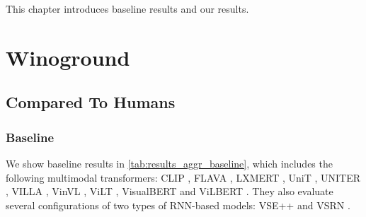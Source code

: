 This chapter introduces baseline results and our results.

\section{Winoground}

\subsection{Compared To Humans}

\subsubsection{Baseline}

We show baseline results in \cref{tab:results_aggr_baseline}, which includes the following multimodal transformers: CLIP \cite{radford2021clip}, FLAVA \cite{singh2022flava}, LXMERT \cite{tan2020lxmert}, UniT \cite{hu2021unit}, UNITER \cite{chen2020uniter}, VILLA \cite{gan2020villa}, VinVL \cite{zhang2021vinvl}, ViLT \cite{kim2021vilt}, VisualBERT \cite{li2019visualbert} and ViLBERT \cite{lu2019vilbert}. They also evaluate several configurations of two types of RNN-based models: VSE++ \cite{faghri2018vse} and VSRN \cite{li2019vsrn}.

